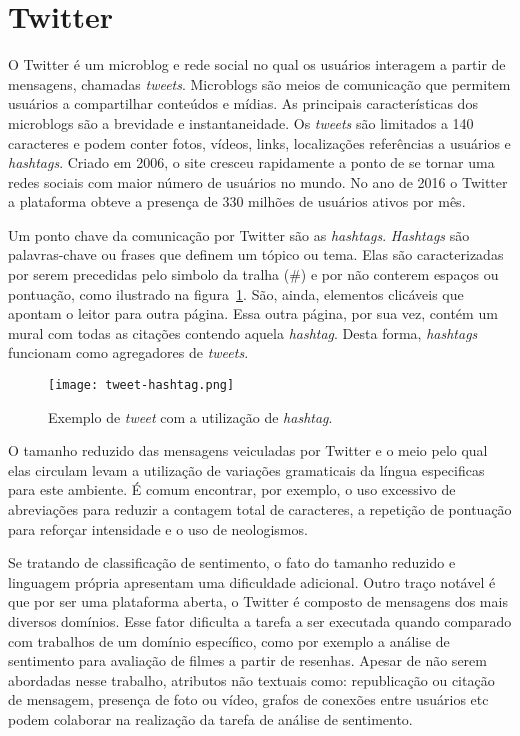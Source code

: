 \section{Twitter}

O Twitter é um microblog e rede social no qual os usuários interagem a partir de mensagens, chamadas \textit{tweets}.
Microblogs são meios de comunicação que permitem usuários a compartilhar conteúdos e mídias.
As principais características dos microblogs são a brevidade e instantaneidade.
Os \textit{tweets} são limitados a 140 caracteres e podem conter fotos, vídeos, links, localizações referências a
usuários e \textit{hashtags}.
Criado em 2006, o site cresceu rapidamente a ponto de se tornar uma redes sociais com maior número de usuários no mundo.
No ano de 2016 o Twitter a plataforma obteve a presença de 330 milhões de usuários ativos por mês.

Um ponto chave da comunicação por Twitter são as \textit{hashtags}.
\textit{Hashtags} são palavras-chave ou frases que definem um tópico ou tema.
Elas são caracterizadas por serem precedidas pelo simbolo da tralha (\#) e por não conterem espaços ou pontuação, como
ilustrado na figura~\ref{fig:hashtag}.
São, ainda, elementos clicáveis que apontam o leitor para outra página.
Essa outra página, por sua vez, contém um mural com todas as citações contendo aquela \textit{hashtag}.
Desta forma, \textit{hashtags} funcionam como agregadores de \textit{tweets}.

\begin{figure}
\begin{center} {
    \begin{center}
    \texttt{[image: tweet-hashtag.png]}
    \caption{Exemplo de \textit{tweet} com a utilização de \textit{hashtag}.}
    \label{fig:hashtag}
    \end{center}
}
\end{center}
\end{figure}

O tamanho reduzido das mensagens veiculadas por Twitter e o meio pelo qual elas circulam levam a utilização de
variações gramaticais da língua especificas para este ambiente.
É comum encontrar, por exemplo, o uso excessivo de abreviações para reduzir a contagem total de caracteres, a repetição
de pontuação para reforçar intensidade e o uso de neologismos.

Se tratando de classificação de sentimento, o fato do tamanho reduzido e linguagem própria apresentam uma dificuldade
adicional.
Outro traço notável é que por ser uma plataforma aberta, o Twitter é composto de mensagens dos mais diversos domínios.
Esse fator dificulta a tarefa a ser executada quando comparado com trabalhos de um domínio específico, como por exemplo
a análise de sentimento para avaliação de filmes a partir de resenhas.
Apesar de não serem abordadas nesse trabalho, atributos não textuais como: republicação ou citação de mensagem, presença
de foto ou vídeo, grafos de conexões entre usuários etc podem colaborar na realização da tarefa de análise de sentimento.
